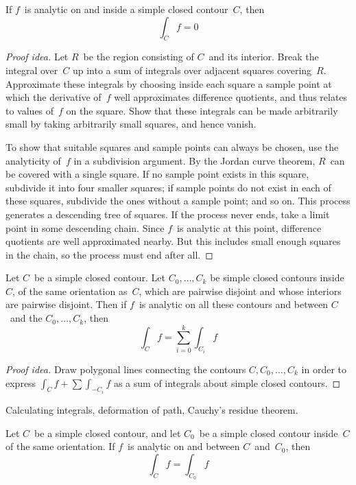 \begin{thm}
If \(f\)~is analytic on and inside a simple closed contour~\(C\), then
\[\int_C f=0\]
\end{thm}
\begin{proof}[Proof idea]
Let \(R\)~be the region consisting of \(C\)~and its interior. Break the integral over~\(C\) up into a sum of integrals over adjacent squares covering~\(R\). Approximate these integrals by choosing inside each square a sample point at which the derivative of~\(f\) well approximates difference quotients, and thus relates to values of~\(f\) on the square. Show that these integrals can be made arbitrarily small by taking arbitrarily small squares, and hence vanish.

To show that suitable squares and sample points can always be chosen, use the analyticity of~\(f\) in a subdivision argument. By the Jordan curve theorem, \(R\)~can be covered with a single square. If no sample point exists in this square, subdivide it into four smaller squares; if sample points do not exist in each of these squares, subdivide the ones without a sample point; and so on. This process generates a descending tree of squares. If the process never ends, take a limit point in some descending chain. Since \(f\)~is analytic at this point, difference quotients are well approximated nearby. But this includes small enough squares in the chain, so the process must end after all.
\end{proof}
\begin{cor}
Let \(C\)~be a simple closed contour. Let \(C_0,\ldots,C_k\) be simple closed contours inside~\(C\), of the same orientation as~\(C\), which are pairwise disjoint and whose interiors are pairwise disjoint. Then if \(f\)~is analytic on all these contours and between \(C\)~and the \(C_0,\ldots,C_k\), then
\[\int_C f=\sum_{i=0}^k\int_{C_i}f\]
\end{cor}
\begin{proof}[Proof idea]
Draw polygonal lines connecting the contours \(C,C_0,\ldots,C_k\) in order to express \(\int_C f+\sum\int_{-C_i}f\) as a sum of integrals about simple closed contours.
\end{proof}
\begin{app}
Calculating integrals, deformation of path, Cauchy's residue theorem.
\end{app}
\begin{cor}
Let \(C\)~be a simple closed contour, and let \(C_0\)~be a simple closed contour inside~\(C\) of the same orientation. If \(f\)~is analytic on and between \(C\)~and~\(C_0\), then
\[\int_C f=\int_{C_0}f\]
\end{cor}
